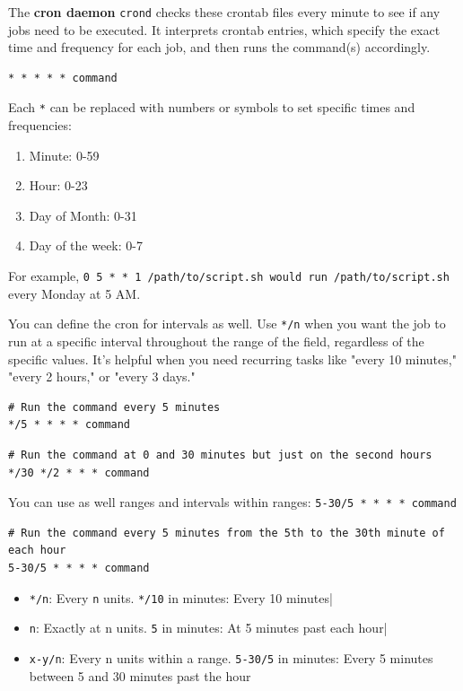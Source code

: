 \documentclass{article}
\newenvironment{blocktemplateI}[1]{%
    \tcolorbox[beamer,%
    noparskip,breakable,
    colframe=Violet,%
    colbacklower=Black,%
    title=#1]}%
    {\endtcolorbox}
\newenvironment{codetemplate}[1][]{%
  \mybasecolorbox[#1]
  \itshape
}{%
  \endmybasecolorbox
}
\begin{document}
The \textbf{cron daemon} \verb|crond| checks these crontab files every minute to see if any jobs need to be executed.
It interprets crontab entries, which specify the exact time and frequency for each job, and then runs the command(s) accordingly.

\begin{codetemplate}{}
\begin{verbatim}
* * * * * command
\end{verbatim}
\end{codetemplate}

Each \verb|*| can be replaced with numbers or symbols to set specific times and frequencies:
\begin{enumerate}
    \item Minute: 0-59
    \item Hour: 0-23
    \item Day of Month: 0-31
    \item Day of the week: 0-7 
\end{enumerate}

For example, \verb|0 5 * * 1 /path/to/script.sh would run /path/to/script.sh| every Monday at 5 AM.

\begin{blocktemplateI}{NOTE}
You can define the cron for intervals as well. Use \verb|*/n| when you want the job to run at a specific interval throughout the range of the field, regardless of the specific values. It’s helpful when you need recurring tasks like "every 10 minutes," "every 2 hours," or "every 3 days."
\begin{codetemplate}{}
\begin{verbatim}
# Run the command every 5 minutes
*/5 * * * * command
\end{verbatim}
\end{codetemplate}
\begin{codetemplate}{}
\begin{verbatim}
# Run the command at 0 and 30 minutes but just on the second hours
*/30 */2 * * * command
\end{verbatim}
\end{codetemplate}

You can use as well ranges and intervals within ranges: \verb|5-30/5 * * * * command|
\begin{codetemplate}{}
\begin{verbatim}
# Run the command every 5 minutes from the 5th to the 30th minute of each hour
5-30/5 * * * * command
\end{verbatim}
\end{codetemplate}

\begin{itemize}
    \item \verb|*/n|: Every \verb|n| units.	\verb|*/10| in minutes: Every 10 minutes|
    \item \verb|n|:	Exactly at n units. \verb|5| in minutes: At 5 minutes past each hour|
    \item \verb|x-y/n|:	Every n units within a range. \verb|5-30/5| in minutes: Every 5 minutes between 5 and 30 minutes past the hour
\end{itemize}
\end{blocktemplateI}
\end{document}
